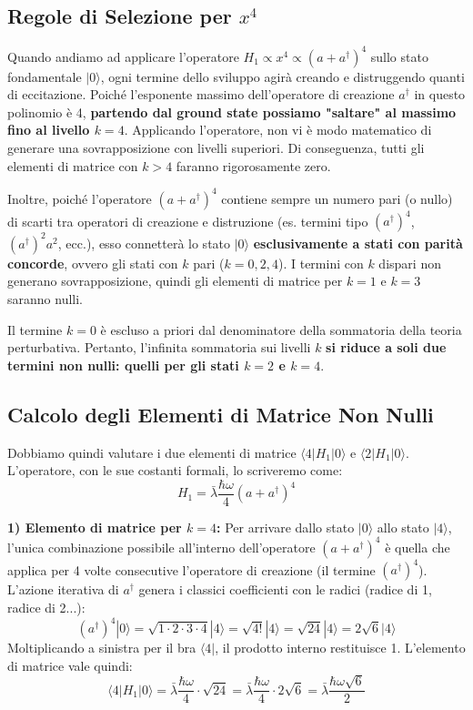 \subsection{Regole di Selezione per $x^4$}
Quando andiamo ad applicare l'operatore $H_1 \propto x^4 \propto (a + a^\dagger)^4$ sullo stato fondamentale $\vert{}0\rangle$, ogni termine dello sviluppo agirà creando e distruggendo quanti di eccitazione.
Poiché l'esponente massimo dell'operatore di creazione $a^\dagger$ in questo polinomio è 4, \textbf{partendo dal ground state possiamo "saltare" al massimo fino al livello $k=4$}. Applicando l'operatore, non vi è modo matematico di generare una sovrapposizione con livelli superiori. Di conseguenza, tutti gli elementi di matrice con $k > 4$ faranno rigorosamente zero.

Inoltre, poiché l'operatore $(a+a^\dagger)^4$ contiene sempre un numero pari (o nullo) di scarti tra operatori di creazione e distruzione (es. termini tipo $(a^\dagger)^4$, $(a^\dagger)^2 a^2$, ecc.), esso connetterà lo stato $\vert{}0\rangle$ \textbf{esclusivamente a stati con parità concorde}, ovvero gli stati con $k$ pari ($k = 0, 2, 4$).
I termini con $k$ dispari non generano sovrapposizione, quindi gli elementi di matrice per $k=1$ e $k=3$ saranno nulli.

Il termine $k=0$ è escluso a priori dal denominatore della sommatoria della teoria perturbativa. Pertanto, l'infinita sommatoria sui livelli $k$ \textbf{si riduce a soli due termini non nulli: quelli per gli stati $k=2$ e $k=4$}.

\subsection{Calcolo degli Elementi di Matrice Non Nulli}
Dobbiamo quindi valutare i due elementi di matrice $\langle 4 \vert{} H_1 \vert{} 0 \rangle$ e $\langle 2 \vert{} H_1 \vert{} 0 \rangle$.
L'operatore, con le sue costanti formali, lo scriveremo come:
\begin{equation}
H_1 = \bar{\lambda} \frac{\hbar \omega}{4} (a + a^\dagger)^4
\end{equation}

\textbf{1) Elemento di matrice per $k=4$:}
Per arrivare dallo stato $\vert{}0\rangle$ allo stato $\vert{}4\rangle$, l'unica combinazione possibile all'interno dell'operatore $(a + a^\dagger)^4$ è quella che applica per 4 volte consecutive l'operatore di creazione (il termine $(a^\dagger)^4$).
L'azione iterativa di $a^\dagger$ genera i classici coefficienti con le radici (radice di 1, radice di 2...):
\begin{equation}
(a^\dagger)^4 |0\rangle = \sqrt{1 \cdot 2 \cdot 3 \cdot 4} |4\rangle = \sqrt{4!} |4\rangle = \sqrt{24} |4\rangle = 2\sqrt{6} |4\rangle
\end{equation}
Moltiplicando a sinistra per il bra $\langle 4 \vert{}$, il prodotto interno restituisce 1. L'elemento di matrice vale quindi:
\begin{equation}
\langle 4 | H_1 | 0 \rangle = \bar{\lambda} \frac{\hbar \omega}{4} \cdot \sqrt{24} = \bar{\lambda} \frac{\hbar \omega}{4} \cdot 2\sqrt{6} = \bar{\lambda} \frac{\hbar \omega \sqrt{6}}{2}
\end{equation}

